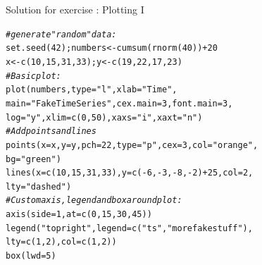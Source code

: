 \documentclass[xcolor=table,       handout,    xcolor=dvipsnames]{beamer}\usepackage[]{graphicx}\usepackage[]{color}
\makeatletter
\newcommand{\hlnum}[1]{\textcolor[rgb]{0,0,0}{#1}}
\newcommand{\hlstr}[1]{\textcolor[rgb]{0.545,0.137,0.137}{#1}}
\newcommand{\hlcom}[1]{\textcolor[rgb]{0,0.392,0}{\textit{#1}}}
\newcommand{\hlopt}[1]{\textcolor[rgb]{0,0,0}{#1}}
\newcommand{\hlstd}[1]{\textcolor[rgb]{0,0,0}{#1}}
\newcommand{\hlkwb}[1]{\textcolor[rgb]{0,0,0}{#1}}
\newcommand{\hlkwc}[1]{\textcolor[rgb]{1,0,1}{#1}}
\newcommand{\hlkwd}[1]{\textcolor[rgb]{0,0,1}{#1}}
\newenvironment{kframe}{%
 \def\at@end@of@kframe{}%
 \ifinner\ifhmode%
  \def\at@end@of@kframe{\end{minipage}}%
  \begin{minipage}{\columnwidth}%
 \fi\fi%
 \def\FrameCommand##1{\hskip\@totalleftmargin \hskip-\fboxsep
 \colorbox{shadecolor}{##1}\hskip-\fboxsep
     \hskip-\linewidth \hskip-\@totalleftmargin \hskip\columnwidth}%
 \MakeFramed {\advance\hsize-\width
   \@totalleftmargin\z@ \linewidth\hsize
   \@setminipage}}%
 {\par\unskip\endMakeFramed%
 \at@end@of@kframe}
\newenvironment{knitrout}{}{} %
\newcounter{exercisecount}
\makeatother
\begin{document}
\begin{frame}[fragile]{Solution for exercise : Plotting I}
\begin{knitrout}\small
{}\color{fgcolor}\begin{kframe}
\begin{alltt}
\hlcom{# generate "random" data:}
\hlkwd{set.seed}\hlstd{(}\hlnum{42}\hlstd{) ; numbers} \hlkwb{<-} \hlkwd{cumsum}\hlstd{(}\hlkwd{rnorm}\hlstd{(}\hlnum{40}\hlstd{))} \hlopt{+} \hlnum{20}
\hlstd{x} \hlkwb{<-} \hlkwd{c}\hlstd{(}\hlnum{10}\hlstd{,} \hlnum{15}\hlstd{,} \hlnum{31}\hlstd{,} \hlnum{33}\hlstd{); y} \hlkwb{<-} \hlkwd{c}\hlstd{(}\hlnum{19}\hlstd{,} \hlnum{22}\hlstd{,} \hlnum{17}\hlstd{,} \hlnum{23}\hlstd{)}
\hlcom{# Basic plot:}
\hlkwd{plot}\hlstd{(numbers,} \hlkwc{type}\hlstd{=}\hlstr{"l"}\hlstd{,} \hlkwc{xlab}\hlstd{=}\hlstr{"Time"}\hlstd{,}
     \hlkwc{main}\hlstd{=}\hlstr{"Fake Time Series"}\hlstd{,} \hlkwc{cex.main}\hlstd{=}\hlnum{3}\hlstd{,} \hlkwc{font.main}\hlstd{=}\hlnum{3}\hlstd{,}
     \hlkwc{log}\hlstd{=}\hlstr{"y"}\hlstd{,} \hlkwc{xlim}\hlstd{=}\hlkwd{c}\hlstd{(}\hlnum{0}\hlstd{,}\hlnum{50}\hlstd{),} \hlkwc{xaxs}\hlstd{=}\hlstr{"i"}\hlstd{,} \hlkwc{xaxt}\hlstd{=}\hlstr{"n"} \hlstd{)}
\hlcom{# Add points and lines}
\hlkwd{points}\hlstd{(}\hlkwc{x}\hlstd{=x,} \hlkwc{y}\hlstd{=y,} \hlkwc{pch}\hlstd{=}\hlnum{22}\hlstd{,} \hlkwc{type}\hlstd{=}\hlstr{"p"}\hlstd{,} \hlkwc{cex}\hlstd{=}\hlnum{3}\hlstd{,} \hlkwc{col}\hlstd{=}\hlstr{"orange"}\hlstd{,}
      \hlkwc{bg}\hlstd{=}\hlstr{"green"}\hlstd{)}
\hlkwd{lines}\hlstd{(}\hlkwc{x}\hlstd{=}\hlkwd{c}\hlstd{(}\hlnum{10}\hlstd{,} \hlnum{15}\hlstd{,} \hlnum{31}\hlstd{,} \hlnum{33}\hlstd{),} \hlkwc{y}\hlstd{=}\hlkwd{c}\hlstd{(}\hlopt{-}\hlnum{6}\hlstd{,} \hlopt{-}\hlnum{3}\hlstd{,} \hlopt{-}\hlnum{8}\hlstd{,} \hlopt{-}\hlnum{2}\hlstd{)}\hlopt{+}\hlnum{25}\hlstd{,} \hlkwc{col}\hlstd{=}\hlnum{2}\hlstd{,}
      \hlkwc{lty}\hlstd{=}\hlstr{"dashed"}\hlstd{)}
\hlcom{# Custom axis, legend and box around plot:}
\hlkwd{axis}\hlstd{(}\hlkwc{side}\hlstd{=}\hlnum{1}\hlstd{,} \hlkwc{at}\hlstd{=}\hlkwd{c}\hlstd{(}\hlnum{0}\hlstd{,} \hlnum{15}\hlstd{,} \hlnum{30}\hlstd{,} \hlnum{45}\hlstd{)  )}
\hlkwd{legend}\hlstd{(}\hlstr{"topright"}\hlstd{,} \hlkwc{legend}\hlstd{=}\hlkwd{c}\hlstd{(}\hlstr{"ts"}\hlstd{,} \hlstr{"more fake stuff"}\hlstd{),}
       \hlkwc{lty}\hlstd{=}\hlkwd{c}\hlstd{(}\hlnum{1}\hlstd{,}\hlnum{2}\hlstd{),} \hlkwc{col}\hlstd{=}\hlkwd{c}\hlstd{(}\hlnum{1}\hlstd{,}\hlnum{2}\hlstd{) )}
\hlkwd{box}\hlstd{(}\hlkwc{lwd}\hlstd{=}\hlnum{5}\hlstd{)}
\end{alltt}
\end{kframe}
\end{knitrout}
\end{frame}
\end{document}
